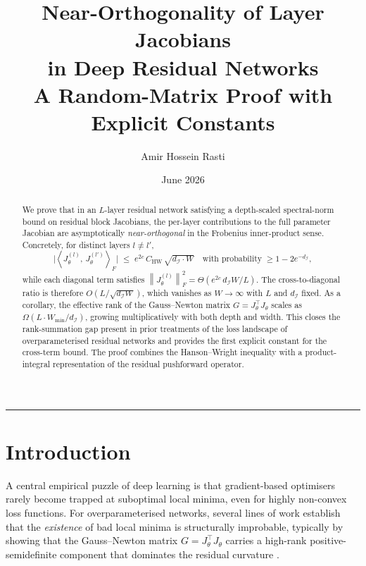 \documentclass[11pt]{article}
\title{%
  \textbf{Near-Orthogonality of Layer Jacobians\\[0.2em]
  in Deep Residual Networks}\\[0.6em]
  \large A Random-Matrix Proof with Explicit Constants
}
\author{Amir Hossein Rasti}
\date{June 2026}
\theoremstyle{plain}
\theoremstyle{definition}
\theoremstyle{remark}
\newcommand{\norm}[1]{\left\|#1\right\|}
\newcommand{\inner}[2]{\left\langle #1,\, #2 \right\rangle}
\newcommand{\dI}{d_{\mathcal{I}}}
\begin{document}
\maketitle
\vspace{-1em}
\noindent\rule{\linewidth}{0.4pt}
\vspace{0.5em}
\thispagestyle{empty}

\begin{abstract}
We prove that in an $L$-layer residual network satisfying a depth-scaled
spectral-norm bound on residual block Jacobians, the per-layer contributions
to the full parameter Jacobian are asymptotically \emph{near-orthogonal} in
the Frobenius inner-product sense.  Concretely, for distinct layers
$l \neq l'$,
\[
  \bigl|\inner{J_{\theta}^{(l)}}{J_{\theta}^{(l')}}_F\bigr|
  \;\leq\;
  e^{2c}\,C_{\mathrm{HW}}\,\sqrt{\dI\cdot W}
  \quad\text{with probability}\;\geq 1-2e^{-\dI},
\]
while each diagonal term satisfies
$\norm{J_{\theta}^{(l)}}_F^2 = \Theta\!\left(e^{2c}\,\dI W/L\right)$.
The cross-to-diagonal ratio is therefore $O\!\left(L/\sqrt{\dI W}\right)$,
which vanishes as $W\to\infty$ with $L$ and $\dI$ fixed.
As a corollary, the effective rank of the Gauss--Newton matrix
$G = J_\theta^\top J_\theta$ scales as
$\Omega(L\cdot W_{\min}/\dI)$, growing multiplicatively with both depth
and width.  This closes the rank-summation gap present in prior treatments
of the loss landscape of overparameterised residual networks and provides
the first explicit constant for the cross-term bound.
The proof combines the Hanson--Wright inequality \citep{rudelson2013}
with a product-integral representation of the residual pushforward operator.
\end{abstract}

\section{Introduction}
\label{sec:intro}

A central empirical puzzle of deep learning is that gradient-based
optimisers rarely become trapped at suboptimal local minima, even for
highly non-convex loss functions.  For overparameterised networks, several
lines of work establish that the \emph{existence} of bad local minima is
structurally improbable, typically by showing that the Gauss--Newton matrix
$G = J_\theta^\top J_\theta$ carries a high-rank positive-semidefinite
component that dominates the residual curvature
\citep{kawaguchi2016,du2019,oymak2020}.
\end{document}

